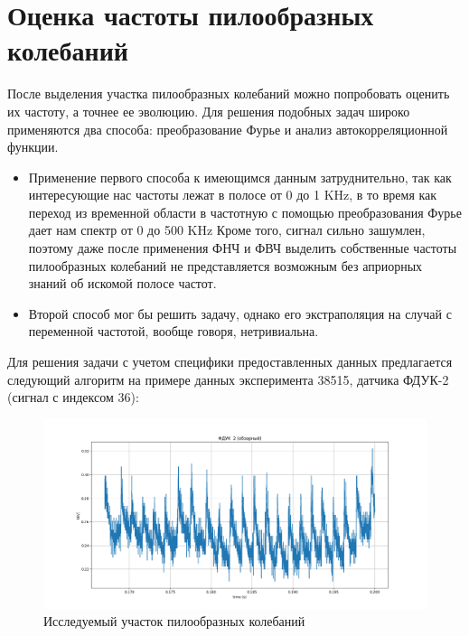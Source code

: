 \documentclass[12pt,a4paper]{article}
\begin{document}
		\section{Оценка частоты пилообразных колебаний}
		После выделения участка пилообразных колебаний можно попробовать оценить их частоту, а точнее ее эволюцию. Для решения подобных задач широко применяются два способа: преобразование Фурье и анализ автокорреляционной функции. 
		\begin{itemize}
			\item Применение первого способа к имеющимся данным затруднительно, так как интересующие нас частоты лежат в полосе от 0 до 1 KHz, в то время как переход из временной области в частотную
			с помощью преобразования Фурье дает нам спектр от 0 до 500 KHz Кроме того, сигнал сильно зашумлен, поэтому даже после применения ФНЧ и ФВЧ выделить собственные частоты пилообразных колебаний не представляется возможным без априорных знаний об искомой полосе частот.
			
			\item Второй способ мог бы решить задачу, однако его экстраполяция на случай с переменной частотой, вообще говоря, нетривиальна.
		\end{itemize}
		
		Для решения задачи с учетом специфики предоставленных данных предлагается следующий алгоритм на примере данных эксперимента 38515, датчика ФДУК-2 (сигнал с индексом 36):
		
		\FloatBarrier
		\begin{figure}[h!]
			\centering\includegraphics[width=1\linewidth]{./../plots/freq_raw.png}
			\caption{Исследуемый участок пилообразных колебаний}
		\end{figure}
		\FloatBarrier
		
\end{document}

